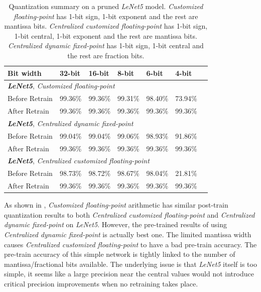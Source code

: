\documentclass[a4paper,12pt]{report}
\begin{document}
\begin{table}[!h]
  \centering
  \begin{tabular}{lllllll}
    \hline
    \hline
    Bit width               &32-bit     &16-bit       &8-bit       &6-bit     &4-bit\\
    \hline
    \multicolumn{5}{l}{\textbf{\textit{LeNet5}}, \textit{Customized floating-point}}\\
    \hline
    \hline
    Before Retrain          &99.36\%    &99.36\%      &99.31\%     &98.40\%   &73.94\%\\
    After Retrain           &99.36\%    &99.36\%      &99.36\%     &99.36\%   &99.36\%\\
    \hline
    \hline
    \multicolumn{5}{l}{\textbf{\textit{LeNet5}}, \textit{Centralized dynamic fixed-point}}\\
    \hline
    Before Retrain          &99.04\%    &99.04\%    &99.06\%     &98.93\%   &91.86\%\\
    After Retrain           &99.36\%    &99.36\%    &99.36\%     &99.36\%   &99.36\%\\
    \hline
    \hline
    \multicolumn{5}{l}{\textbf{\textit{LeNet5}}, \textit{Centralized customized floating-point}}\\
    \hline
    Before Retrain          &98.73\%    &98.72\%    &98.67\%     &98.04\%   &21.81\%\\
    After Retrain           &99.36\%    &99.36\%    &99.36\%     &99.36\%   &99.36\%\\
    \hline
    \hline
  \end{tabular}
  \caption{Quantization summary on a pruned \textit{LeNet5} model. \textit{Customized
  floating-point} has 1-bit sign, 1-bit exponent and the rest are mantissa bits.
  \textit{Centralized customized floating-point} has 1-bit sign, 1-bit central,
  1-bit exponent and the rest are mantissa bits.
  \textit{Centralized dynamic fixed-point} has
  1-bit sign, 1-bit central and the rest are fraction bits.}
  \label{tab:pruned_quan1}
\end{table}

As shown in , \textit{Customized floating-point} arithmetic
has similar post-train quantization results to both \textit{Centralized customized floating-point}
and \textit{Centralized dynamic fixed-point} on \textit{LeNet5}.
However, the pre-trained results of using \textit{Centralized dynamic fixed-point}
is actually best one.
The limited mantissa width causes \textit{Centralized customized floating-point} to
have a bad pre-train accuracy.
The pre-train accuracy of this simple network is tightly linked to the number of
mantissa/fractional bits available.
The underlying issue is that \textit{LeNet5} itself is too simple, it seems
like a large precision near the central values would not introduce critical
precision improvements when no retraining takes place.
\end{document}
